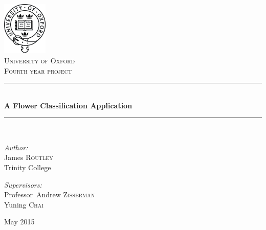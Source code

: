 \documentclass[11pt, a4paper]{report}
\newcommand{\HRule}{\rule{\linewidth}{0.5mm}}
\begin{document}
\begin{titlepage}
\begin{center}

\includegraphics[width=0.16\textwidth]{img/OxfLogo.png}~\\[1.5cm]

\textsc{\LARGE University of Oxford}\\[1.5cm]
\textsc{\Large Fourth year project}\\[0.5cm]

\HRule \\[0.4cm]
{ \huge \bfseries A Flower Classification Application \\[0.4cm] }

\HRule \\[1.5cm]

\noindent
\begin{minipage}[t]{0.4\textwidth}
\begin{flushleft} \large
\emph{Author:}\\
James \textsc{Routley} \\
Trinity College
\end{flushleft}
\end{minipage}%
\begin{minipage}[t]{0.4\textwidth}
\begin{flushright} \large
\emph{Supervisors:} \\
Professor~Andrew \textsc{Zisserman} \\
Yuning \textsc{Chai}
\end{flushright}
\end{minipage}

\vfill

{\large May 2015}

\end{center}
\end{titlepage}
\end{document}
